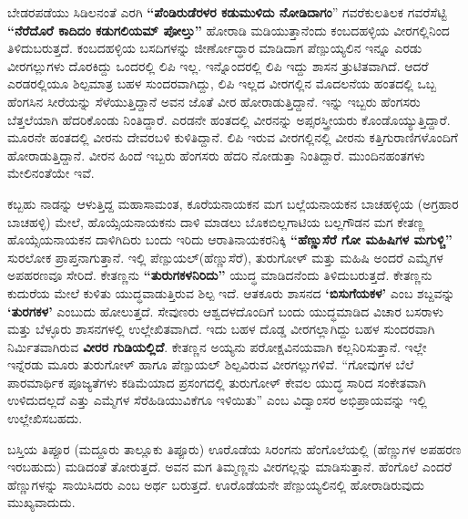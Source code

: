 ಬೇಡರಪಡೆಯು ಸಿಡಿಲನಂತೆ ಎರಗಿ \textbf{“ಪೆಂಡಿರುಡೆರಳರ ಕಡುಮುಳಿದು ನೋಡಿದಾಗಂ}” ಗವರೆಕುಲತಿಲಕ ಗವರೆಸೆಟ್ಟಿ \textbf{“ನೆರೆದೊರೆ ಕಾದಿದಂ ಕಡುಗಲಿಯಮ್ ಪೋಲ್ತು”} ಹೋರಾಡಿ ಮಡಿಯುತ್ತಾನೆಂದು ಕಂಬದಹಳ್ಳಿಯ ವೀರಗಲ್ಲಿನಿಂದ ತಿಳಿದು\-ಬರುತ್ತದೆ. ಕಂಬದಹಳ್ಳಿಯ ಬಸದಿಗಳನ್ನು ಜೀರ್ಣೋದ್ಧಾರ ಮಾಡಿದಾಗ ಪೆಣ್ಪುಯ್ಯಲಿನ ಇನ್ನೂ ಎರಡು ವೀರಗಲ್ಲುಗಳು ದೊರಕಿದ್ದು ಒಂದರಲ್ಲಿ ಲಿಪಿ ಇಲ್ಲ. ಇನ್ನೊಂದರಲ್ಲಿ ಲಿಪಿ ಇದ್ದು ಶಾಸನ ತ್ರುಟಿತವಾಗಿದೆ. ಆದರೆ ಎರಡರಲ್ಲಿಯೂ ಶಿಲ್ಪಮಾತ್ರ ಬಹಳ ಸುಂದರವಾಗಿದ್ದು, ಲಿಪಿ ಇಲ್ಲದ ವೀರಗಲ್ಲಿನ ಮೊದಲನೆಯ ಹಂತದಲ್ಲಿ ಒಬ್ಬ ಹೆಂಗಸಿನ ಸೀರೆಯನ್ನು ಸೆಳೆಯುತ್ತಿದ್ದಾನೆ ಅವನ ಜೊತೆ ವೀರ ಹೋರಾಡುತ್ತಿದ್ದಾನೆ. ಇನ್ನು ಇಬ್ಬರು ಹೆಂಗಸರು ಬೆತ್ತಲೆಯಾಗಿ ಹೆದರಿಕೊಂಡು ನಿಂತಿದ್ದಾರೆ. ಎರಡನೇ ಹಂತದಲ್ಲಿ ವೀರನನ್ನು ಅಪ್ಸರಸ್ತ್ರೀಯರು ಕೊಂಡೊಯ್ಯುತ್ತಿದ್ದಾರೆ. ಮೂರನೇ ಹಂತದಲ್ಲಿ ವೀರನು ದೇವರಬಳಿ ಕುಳಿತಿದ್ದಾನೆ. ಲಿಪಿ ಇರುವ ವೀರಗಲ್ಲಿನಲ್ಲಿ ವೀರನು ಕತ್ತಿಗುರಾಣಿಗಳೊಂದಿಗೆ ಹೋರಾಡುತ್ತಿದ್ದಾನೆ. ವೀರನ ಹಿಂದೆ ಇಬ್ಬರು ಹೆಂಗಸರು ಹೆದರಿ ನೋಡುತ್ತಾ ನಿಂತಿದ್ದಾರೆ. ಮುಂದಿನಹಂತಗಳು ಮೇಲಿನಂತೆಯೇ ಇವೆ.

ಕಬ್ಬಹು ನಾಡನ್ನು ಆಳುತ್ತಿದ್ದ ಮಹಾಸಾಮಂತ, ಕೂರೆಯನಾಯಕನ ಮಗ ಬಲ್ಲೆಯನಾಯಕನ ಬಾಚಹಳ್ಳಿಯ (ಅಗ್ರಹಾರ ಬಾಚಹಳ್ಳಿ) ಮೇಲೆ, ಹೊಯ್ಸೆಯನಾಯಕನು ದಾಳಿ ಮಾಡಲು ಬೊಕಬಿಲ್ಲಗಾಟಿಯ ಬಲ್ಲಗೌಡನ ಮಗ ಕೇತಣ್ಣ ಹೊಯ್ಸೆಯನಾಯಕನ ದಾಳಿಗಿದಿರು ಬಂದು ಇರಿದು ಆರಾತಿನಾಯಕರನಿಕ್ಕಿ \textbf{“ಹೆಣ್ಣುಸೆರೆ ಗೋ ಮಹಿಷಿಗಳ ಮಗುಳ್ಚಿ”} ಸುರಲೋಕ ಪ್ರಾಪ್ತನಾಗುತ್ತಾನೆ. ಇಲ್ಲಿ ಪೆಣ್ಪುಯಲ್​(ಹೆಣ್ಣುಸೆರೆ), ತುರುಗೋಳ್​ ಮತ್ತು ಮಹಿಷಿ ಅಂದರೆ ಎಮ್ಮೆಗಳ ಅಪಹರಣವೂ ಸೇರಿದೆ. ಕೇತಣ್ಣನು \textbf{“ತುರುಗಕಳನಿರಿದು”} ಯುದ್ಧ ಮಾಡಿದನೆಂದು ತಿಳಿದುಬರುತ್ತದೆ. ಕೇತಣ್ಣನು ಕುದುರೆಯ ಮೇಲೆ ಕುಳಿತು ಯುದ್ಧವಾಡುತ್ತಿರುವ ಶಿಲ್ಪ ಇದೆ. ಆತಕೂರು ಶಾಸನದ \textbf{‘ಬಿಸುಗೆಯಕಳ’} ಎಂಬ ಶಬ್ದವನ್ನು \textbf{‘ತುರಗಕಳ’} ಎಂಬುದು ಹೋಲುತ್ತದೆ. ಸೇವುಣರು ಆಶ್ವದಳದೊಂದಿಗೆ ಬಂದು ಯುದ್ಧಮಾಡಿದ ವಿಚಾರ ಬಸರಾಳು ಮತ್ತು ಬೆಳ್ಳೂರು ಶಾಸನಗಳಲ್ಲಿ ಉಲ್ಲೇಖಿತವಾಗಿದೆ. ಇದು ಬಹಳ ದೊಡ್ಡ ವೀರಗಲ್ಲಾಗಿದ್ದು ಬಹಳ ಸುಂದರವಾಗಿ ನಿರ್ಮಿತವಾಗಿರುವ \textbf{ವೀರರ ಗುಡಿಯಲ್ಲಿದೆ}. ಕೇತಣ್ಣನ ಅಯ್ಯನು ಪರೋಕ್ಷವಿನಯವಾಗಿ ಕಲ್ಲನಿರಿಸುತ್ತಾನೆ. ಇಲ್ಲೇ ಇನ್ನೆರಡು ಮೂರು ತುರುಗೋಳ್​ ಹಾಗೂ ಪೆಣ್ಪುಯಲ್​ ಶಿಲ್ಪವಿರುವ ವೀರಗಲ್ಲುಗಳಿವೆ. “ಗೋವುಗಳ ಬೆಲೆ ಪಾರಮಾರ್ಥಿಕ ಪೂಜ್ಯತೆಗಳು ಕಡಿಮೆಯಾದ ಪ್ರಸಂಗದಲ್ಲಿ ತುರುಗೋಳ್​ ಕೇವಲ ಯುದ್ಧ ಸಾರಿದ ಸಂಕೇತವಾಗಿ ಉಳಿದುದಲ್ಲದೆ ಎತ್ತು ಎಮ್ಮೆಗಳ ಸೆರೆಹಿಡಿಯುವಿಕೆಗೂ ಇಳಿಯಿತು” ಎಂಬ ವಿದ್ವಾಂಸರ ಅಭಿಪ್ರಾಯವನ್ನು ಇಲ್ಲಿ ಉಲ್ಲೇಖಿಸಬಹದು.

ಬಸ್ತಿಯ ತಿಪ್ಪೂರ (ಮದ್ದೂರು ತಾಲ್ಲೂಕು ತಿಪ್ಪೂರು) ಊರೊಡೆಯ ಸಿರಂಗನು ಹೆಂಗೊಲೆಯಲ್ಲಿ (ಹೆಣ್ಣುಗಳ ಅಪಹರಣ ಇರಬಹುದು) ಮಡಿದಂತೆ ತೋರುತ್ತದೆ. ಅವನ ಮಗ ತಿಮ್ಮಣ್ಣನು ವೀರಗಲ್ಲನ್ನು ಮಾಡಿಸುತ್ತಾನೆ. ಹೆಂಗೊಲೆ ಎಂದರೆ ಹೆಣ್ಣುಗಳನ್ನು ಸಾಯಿಸಿದರು ಎಂಬ ಅರ್ಥ ಬರುತ್ತದೆ. ಊರೊಡೆಯನೇ ಪೆಣ್ಪುಯ್ಯಲಿನಲ್ಲಿ ಹೋರಾಡಿರುವುದು ಮುಖ್ಯವಾದುದು.

